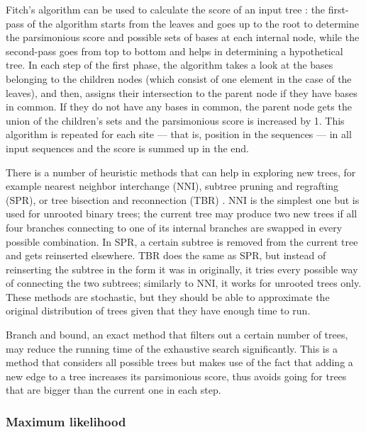 \documentclass[11pt,twocolumn]{article}
\begin{document}
Fitch's algorithm \cite{Fitch1971} can be used to calculate the score of an input tree  \cite{Ortiz2016}\cite{Stoye2009}: the first-pass of the algorithm starts from the leaves and goes up to the root to determine the parsimonious score and possible sets of bases at each internal node, while the second-pass goes from top to bottom and helps in determining a hypothetical tree. In each step of the first phase, the algorithm takes a look at the bases belonging to the children nodes (which consist of one element in the case of the leaves), and then, assigns their intersection to the parent node if they have bases in common. If they do not have any bases in common, the parent node gets the union of the children's sets and the parsimonious score is increased by 1. This algorithm is repeated for each site — that is, position in the sequences — in all input sequences and the score is summed up in the end.

There is a number of heuristic methods that can help in exploring new trees, for example nearest neighbor interchange (NNI), subtree pruning and regrafting (SPR), or tree bisection and reconnection (TBR) \cite{felsenstein2004}. NNI is the simplest one but is used for unrooted binary trees; the current tree may produce two new trees if all four branches connecting to one of its internal branches are swapped in every possible combination. In SPR, a certain subtree is removed from the current tree and gets reinserted elsewhere. TBR does the same as SPR, but instead of reinserting the subtree in the form it was in originally, it tries every possible way of connecting the two subtrees; similarly to NNI, it works for unrooted trees only. These methods are stochastic, but they should be able to approximate the original distribution of trees given that they have enough time to run.

Branch and bound, an exact method that filters out a certain number of trees, may reduce the running time of the exhaustive search significantly. This is a method that considers all possible trees but makes use of the fact that adding a new edge to a tree increases its parsimonious score, thus avoids going for trees that are bigger than the current one in each step.

\subsubsection{Maximum likelihood}
\end{document}
